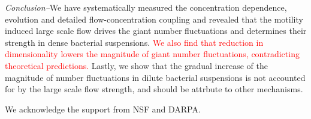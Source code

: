 \documentclass[twocolumn,aps,prl,amsmath,amssymb,longbibliography]{revtex4-2}
\begin{document}
\textit{Conclusion--}We have systematically measured the concentration dependence, evolution and detailed flow-concentration coupling and revealed that the motility induced large scale flow drives the giant number fluctuations and determines their strength in dense bacterial suspensions. \textcolor{red}{We also find that reduction in dimensionality lowers the magnitude of giant number fluctuations, contradicting theoretical predictions.} Lastly, we show that the gradual increase of the magnitude of number fluctuations in dilute bacterial suspensions is not accounted for by the large scale flow strength, and should be attrbute to other mechanisms.

We acknowledge the support from NSF and DARPA.


%

\end{document}

